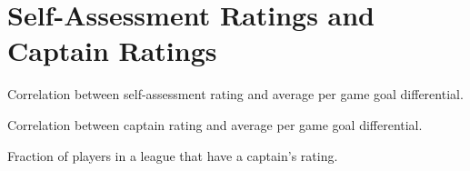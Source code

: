 \section{Self-Assessment Ratings and Captain Ratings}

Correlation between self-assessment rating and average per game goal differential.

Correlation between captain rating and average per game goal differential.

Fraction of players in a league that have a captain's rating.